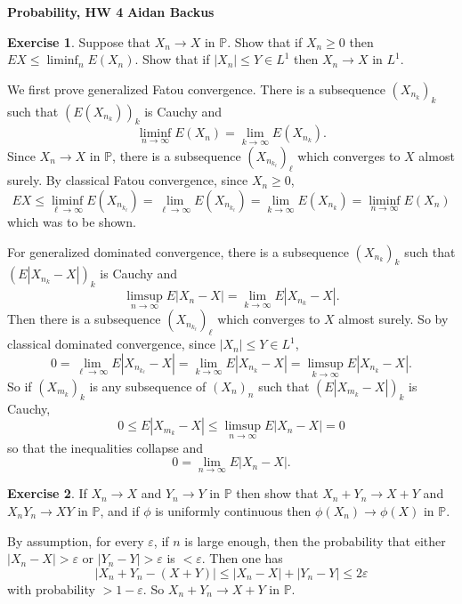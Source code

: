 \documentclass[10pt]{article}
\newcommand{\PP}{\mathbb P}
\theoremstyle{definition}
\newtheorem{exer}{Exercise}
\begin{document}
\noindent
\large\textbf{Probability, HW 4} \hfill \textbf{Aidan Backus} \\


\begin{exer}
Suppose that $X_n \to X$ in $\PP$.
Show that if $X_n \geq 0$ then $EX \leq \liminf_n E(X_n)$.
Show that if $|X_n| \leq Y \in L^1$ then $X_n \to X$ in $L^1$.
\end{exer}

We first prove generalized Fatou convergence.
There is a subsequence $(X_{n_k})_k$ such that $(E(X_{n_k}))_k$ is Cauchy and
$$\liminf_{n \to \infty} E(X_n) = \lim_{k \to \infty} E(X_{n_k}).$$
Since $X_n \to X$ in $\PP$, there is a subsequence $(X_{n_{k_\ell}})_\ell$ which converges to $X$ almost surely.
By classical Fatou convergence, since $X_n \geq 0$,
$$EX \leq \liminf_{\ell \to \infty} E(X_{n_{k_\ell}}) = \lim_{\ell \to \infty} E(X_{n_{k_\ell}}) = \lim_{k \to \infty} E(X_{n_k}) = \liminf_{n \to \infty} E(X_n)$$
which was to be shown.

For generalized dominated convergence, there is a subsequence $(X_{n_k})_k$ such that $(E|X_{n_k} - X|)_k$ is Cauchy and
$$\limsup_{n \to \infty} E|X_n - X| = \lim_{k \to \infty} E|X_{n_k} - X|.$$
Then there is a subsequence $(X_{n_{k_\ell}})_\ell$ which converges to $X$ almost surely.
So by classical dominated convergence, since $|X_n| \leq Y \in L^1$,
$$0 = \lim_{\ell \to \infty} E|X_{n_{k_\ell}} - X| = \lim_{k \to \infty} E|X_{n_k} - X| = \limsup_{k \to \infty} E|X_{n_k} - X|.$$
So if $(X_{m_k})_k$ is any subsequence of $(X_n)_n$ such that $(E|X_{m_k} - X|)_k$ is Cauchy,
$$0 \leq E|X_{m_k} - X| \leq \limsup_{n \to \infty} E|X_n - X| = 0$$
so that the inequalities collapse and
$$0 = \lim_{n \to \infty} E|X_n - X|.$$

\begin{exer}
If $X_n \to X$ and $Y_n \to Y$ in $\PP$ then show that $X_n + Y_n \to X + Y$ and $X_n Y_n \to XY$ in $\PP$, and if $\phi$ is uniformly continuous then $\phi(X_n) \to \phi(X)$ in $\PP$.
\end{exer}

By assumption, for every $\varepsilon$, if $n$ is large enough, then the probability that either $|X_n - X| > \varepsilon$ or $|Y_n - Y| > \varepsilon$ is $< \varepsilon$.
Then one has
$$|X_n + Y_n - (X + Y)| \leq |X_n - X| + |Y_n - Y| \leq 2\varepsilon$$
with probability $> 1 - \varepsilon$.
So $X_n + Y_n \to X + Y$ in $\PP$.
\end{document}
